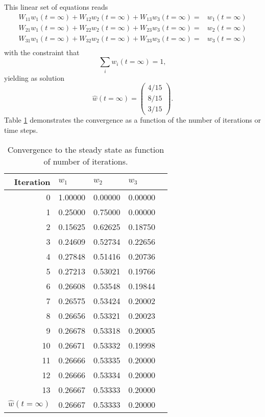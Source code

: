This linear set of equations reads
\begin{eqnarray}
 W_{11}w_1(t=\infty) +W_{12}w_2(t=\infty) +W_{13}w_3(t=\infty)=&w_1(t=\infty) \nonumber \\
W_{21}w_1(t=\infty) + W_{22}w_2(t=\infty) + W_{23}w_3(t=\infty)=&w_2(t=\infty) \nonumber \\
W_{31}w_1(t=\infty) + W_{32}w_2(t=\infty) + W_{33}w_3(t=\infty)=&w_3(t=\infty) \nonumber \\
\end{eqnarray}
with the constraint that 
\[
   \sum_i w_i(t=\infty) = 1, 
\]
yielding as solution
\[
\hat{w}(t=\infty)=  \left(\begin{array}{c} 4/15\\                   
                                8/15 \\                   
                                3/15 \end{array} \right).
\]
Table \ref{tab:simplemodelw} demonstrates the convergence as a function of the number of iterations or
time steps.
\begin{table}
\caption{Convergence to the steady state as function of number of iterations. \label{tab:simplemodelw}} 
\begin{center}
\begin{tabular}{rllll}\hline
Iteration &$w_1$   &$w_2$  &$w_3$\\\hline
0  & 1.00000 &0.00000  &0.00000 \\
1  & 0.25000 &0.75000  &0.00000 \\
2  & 0.15625 &0.62625  &0.18750 \\
3  & 0.24609 &0.52734  &0.22656 \\
4   &0.27848 &0.51416 &0.20736 \\
5   &0.27213 &0.53021 &0.19766 \\
6   &0.26608 &0.53548 &0.19844 \\
7  &0.26575 &0.53424 &0.20002 \\
8  &0.26656 &0.53321 &0.20023 \\
9  &0.26678 &0.53318 &0.20005 \\
10  &0.26671 &0.53332 &0.19998 \\
11  &0.26666 &0.53335 &0.20000 \\
12  &0.26666 &0.53334 &0.20000 \\
13  &0.26667 &0.53333 &0.20000 \\
$\hat{w}(t=\infty)$ &0.26667 &0.53333 &0.20000 \\
\hline
\end{tabular} 
\end{center}   
\end{table}
